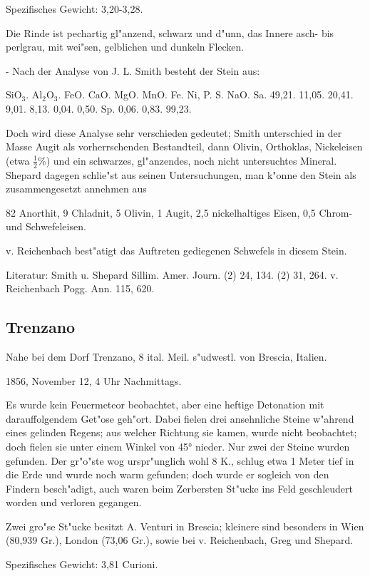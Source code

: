 \documentclass[a4paper, 11pt, oneside]{article}
\begin{document}
Spezifisches Gewicht: 3,20-3,28.

Die Rinde ist pechartig gl"anzend, schwarz und d"unn, das Innere asch- bis perlgrau, mit wei"sen, gelblichen und dunkeln Flecken.

- Nach der Analyse von J. L. Smith besteht der Stein aus:

SiO$_{3}$. Al$_{2}$O$_{3}$. FeO. CaO. MgO. MnO. Fe. Ni, P. S. NaO. Sa.  
49,21. 11,05. 20,41. 9,01. 8,13. 0,04. 0,50. Sp. 0,06. 0,83. 99,23.

Doch wird diese Analyse sehr verschieden gedeutet; Smith unterschied in der Masse Augit als vorherrschenden Bestandteil, dann Olivin, Orthoklas, Nickeleisen (etwa $\frac{1}{2}$\%) und ein schwarzes, gl"anzendes, noch nicht untersuchtes Mineral. Shepard dagegen schlie"st aus seinen Untersuchungen, man k"onne den Stein als zusammengesetzt annehmen aus

82 Anorthit,  
9 Chladnit,  
5 Olivin,  
1 Augit,  
2,5 nickelhaltiges Eisen,  
0,5 Chrom- und Schwefeleisen.

v. Reichenbach best"atigt das Auftreten gediegenen Schwefels in diesem Stein.

Literatur: Smith u. Shepard Sillim. Amer. Journ. (2) 24, 134. (2) 31, 264. v. Reichenbach Pogg. Ann. 115, 620.

\subsection{Trenzano}

Nahe bei dem Dorf Trenzano, 8 ital. Meil. s"udwestl. von Brescia, Italien.

1856, November 12, 4 Uhr Nachmittags.

Es wurde kein Feuermeteor beobachtet, aber eine heftige Detonation mit darauffolgendem Get"ose geh"ort. Dabei fielen drei ansehnliche Steine w"ahrend eines gelinden Regens; aus welcher Richtung sie kamen, wurde nicht beobachtet; doch fielen sie unter einem Winkel von 45° nieder. Nur zwei der Steine wurden gefunden. Der gr"o"ste wog urspr"unglich wohl 8 K., schlug etwa 1 Meter tief in die Erde und wurde noch warm gefunden; doch wurde er sogleich von den Findern besch"adigt, auch waren beim Zerbersten St"ucke ins Feld geschleudert worden und verloren gegangen.

Zwei gro"se St"ucke besitzt A. Venturi in Brescia; kleinere sind besonders in Wien (80,939 Gr.), London (73,06 Gr.), sowie bei v. Reichenbach, Greg und Shepard.

Spezifisches Gewicht: 3,81 Curioni.
\end{document}
